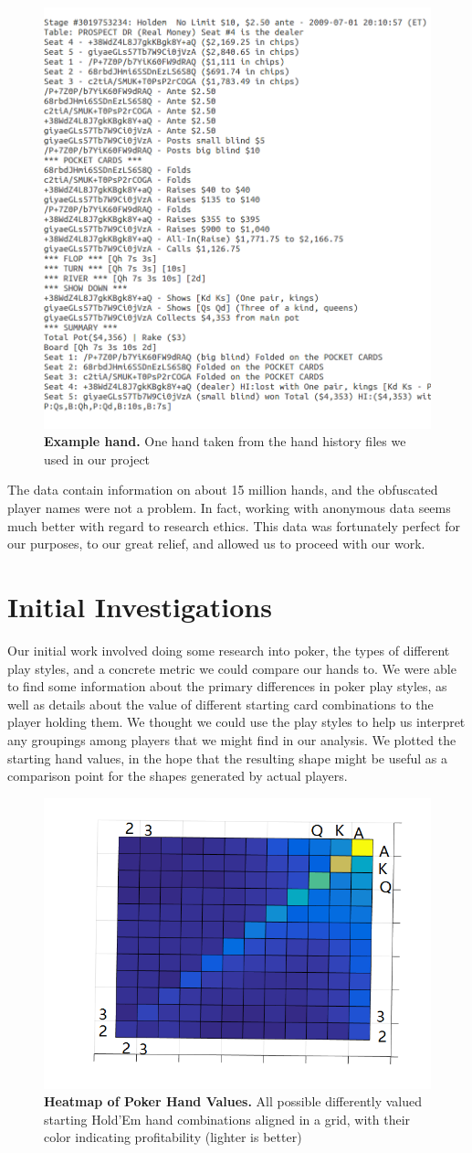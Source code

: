 \documentclass[11pt]{article}
\begin{document}
\begin{figure}[ht!]
		\includegraphics[width=.45\textwidth]{hand}
  		\caption{\textbf{Example hand.} One hand taken from the hand history files
  		we used in our project}
\end{figure}

The data contain information on about 15 million hands, and the obfuscated player
names were not a problem. In fact, working with anonymous data seems much better
with regard to research ethics. This data was fortunately perfect for our purposes,
to our great relief, and allowed us to proceed with our work.

\section*{Initial Investigations}
Our initial work involved doing some research into poker, the types of different
play styles, and a concrete metric we could compare our hands to.  We were
able to find some information about the primary differences in poker play styles,
as well as details about the value of different starting card combinations to the
player holding them. We thought we could use the play styles to help us interpret
any groupings among players that we might find in our analysis. We plotted the
starting hand values, in the hope that the resulting shape might be useful
as a comparison point for the shapes generated by actual players.

\begin{figure}[ht!]
		\includegraphics[width=.45\textwidth]{score}
  		\caption{\textbf{Heatmap of Poker Hand Values.} All possible differently 
  		valued starting Hold'Em hand combinations aligned in a grid, with 
  		their color indicating profitability (lighter is better)}
\end{figure}
\end{document}
